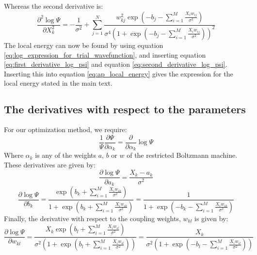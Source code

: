 \documentclass[a4paper, 10pt]{article}
\begin{document}
\begin{appendices}
\begin{equation}
	\end{equation}
	Whereas the second derivative is:
	\begin{equation}\label{eq:second_derivative_log_psi}
	\frac{\partial^2 \log \Psi}{\partial X_k^2}=-\frac{1}{\sigma^2}+\sum_{j=1}^N \frac{w_{kj}^2 \exp \left(-b_j-\sum_{i=1}^{M}\frac{X_iw_{ij}}{\sigma^2} \right)}{\sigma^4\left(1+ \exp \left(-b_j-\sum_{i=1}^{M} \frac{X_iw_{ij}}{\sigma^2}\right)\right)^2}
	\end{equation}
	The local energy can now be found by using equation \ref{eq:log_expression_for_trial_wavefunction}, and inserting equation \ref{eq:first_derivative_log_psi} and equation \ref{eq:second_derivative_log_psi}. Inserting this into equation \ref{eq:ap_local_energy} gives the expression for the local energy stated in the main text.
	\subsection{The derivatives with respect to the parameters}\label{ap:derivative_parameters}
	For our optimization method, we require:
	\begin{equation}
	\frac{1}{\Psi}\frac{\partial \Psi}{\partial \alpha_k}=\frac{\partial }{\partial \alpha_k}\log \Psi
	\end{equation}
	Where $\alpha_k$ is any of the weights $a$, $b$ or $w$ of the restricted Boltzmann machine. These derivatives are given by:
	\begin{equation}
	\frac{\partial \log \Psi }{\partial a_k}=\frac{X_k-a_k}{\sigma^2}
	\end{equation}
	\begin{equation}
	\frac{\partial \log \Psi}{\partial b_k}=\frac{\exp \left(b_k+\sum_{i=1}^M \frac{X_iw_{ik}}{\sigma^2}\right)}{1+\exp \left(b_k+\sum_{i=1}^M \frac{X_iw_{ik}}{\sigma^2}\right)}=\frac{1}{1+\exp \left(-b_k-\sum_{i=1}^M \frac{X_i w_{ik}}{\sigma^2}\right)}
	\end{equation}
	Finally, the derivative with respect to the coupling weights, $w_{kl}$ is given by:
	\begin{equation}
	\frac{\partial \log \Psi}{\partial w_{kl}}=\frac{X_k\exp\left(b_l+\sum_{i=1}^M \frac{X_iw_{il}}{\sigma^2}\right)}{\sigma^2\left(1+\exp \left( b_l + \sum_{i=1}^M \frac{X_iw_{il}}{\sigma^2}\right)\right)}=\frac{X_k}{\sigma^2\left(1+\exp \left(-b_l-\sum_{i=1}^M \frac{X_iw_{il}}{\sigma^2}\right)\right)}
	\end{equation}

\end{appendices}
\end{document}
